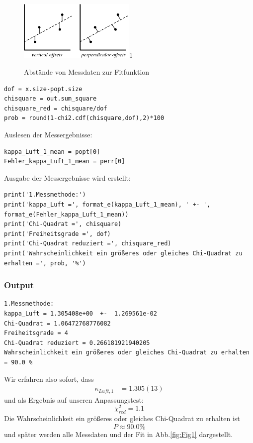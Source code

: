 \documentclass[a4paper,10pt]{article}
\begin{document}
\begin{figure}[htb]
  \centering
  \begin{annotate}{\includegraphics[width=0.5\textwidth]{chi.png}}{1}
  \end{annotate}
\caption[Abstände von Messdaten zur Fitfunktion]{Abstände von Messdaten zur Fitfunktion\footnotemark}
\label{fig:chi}
\end{figure}

\begin{lstlisting}
dof = x.size-popt.size
chisquare = out.sum_square
chisquare_red = chisquare/dof
prob = round(1-chi2.cdf(chisquare,dof),2)*100

\end{lstlisting}

Auslesen der Messergebnisse:\begin{lstlisting}
kappa_Luft_1_mean = popt[0]
Fehler_kappa_Luft_1_mean = perr[0]

\end{lstlisting}

Ausgabe der Messergebnisse wird erstellt:\begin{lstlisting}
print('1.Messmethode:')
print('kappa_Luft =', format_e(kappa_Luft_1_mean), ' +- ', format_e(Fehler_kappa_Luft_1_mean))
print('Chi-Quadrat =', chisquare)
print('Freiheitsgrade =', dof)
print('Chi-Quadrat reduziert =', chisquare_red)
print('Wahrscheinlichkeit ein größeres oder gleiches Chi-Quadrat zu erhalten =', prob, '%')

\end{lstlisting}

\subsubsection{Output}
\begin{lstlisting}
1.Messmethode:
kappa_Luft = 1.305408e+00  +-  1.269561e-02
Chi-Quadrat = 1.06472768776082
Freiheitsgrade = 4
Chi-Quadrat reduziert = 0.266181921940205
Wahrscheinlichkeit ein größeres oder gleiches Chi-Quadrat zu erhalten = 90.0 %
\end{lstlisting}
Wir erfahren also sofort, dass
\begin{align*}
{\kappa_{Luft,1}}&=1.305(13)
\end{align*}
und als Ergebnis auf unseren Anpassungstest:
\[\chi^{2}_{red}=1.1\]
Die Wahrscheinlichkeit ein größeres oder gleiches Chi-Quadrat zu erhalten ist
 \[P\approx  90.0 \%\]
und später werden alle Messdaten und der Fit in  Abb.\ref{fig:Fig1} dargestellt.
\end{document}
